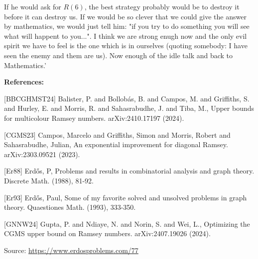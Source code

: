 \documentclass{article}
\begin{document}
If he would ask for $R(6)$, the best strategy probably would be to destroy it before it can destroy us. If we would be so clever that we could give the answer by mathematics, we would just tell him: "if you try to do something you will see what will happent to you...". I think we are strong enugh now and the only evil spirit we have to feel is the one which is in ourselves (quoting somebody: I have seen the enemy and them are us). Now enough of the idle talk and back to Mathematics.'

\bigskip
\noindent\textbf{References:}

[BBCGHMST24] Balister, P. and Bollob\'{a}s, B. and Campos, M. and Griffiths, S. and Hurley, E. 
and Morris, R. and Sahasrabudhe, J. and Tiba, M., Upper bounds for multicolour Ramsey numbers. arXiv:2410.17197 (2024).
 
 [CGMS23] Campos, Marcelo and Griffiths, Simon and Morris, Robert and Sahasrabudhe, Julian, An exponential improvement for diagonal Ramsey. arXiv:2303.09521 (2023).
 
 [Er88] Erd\H{o}s, P, Problems and results in combinatorial analysis and graph theory. Discrete Math. (1988), 81-92.
 
 [Er93] Erd\H{o}s, Paul, Some of my favorite solved and unsolved problems in graph theory. Quaestiones Math. (1993), 333-350.
 
 [GNNW24] Gupta, P. and Ndiaye, N. and Norin, S. and Wei, L., Optimizing the CGMS upper bound on Ramsey numbers. arXiv:2407.19026 (2024).

\bigskip
\noindent\small{Source: \url{https://www.erdosproblems.com/77}}
\end{document}
